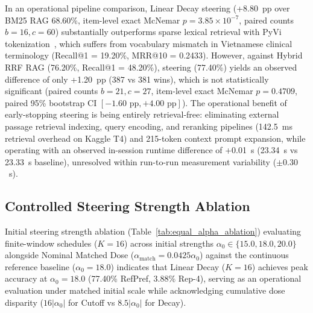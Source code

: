 \documentclass[runningheads]{llncs}
\begin{document}
In an operational pipeline comparison, Linear Decay steering (+8.80~pp over BM25 RAG 68.60\%, item-level exact McNemar $p = 3.85 \times 10^{-7}$, paired counts $b=16, c=60$) substantially outperforms sparse lexical retrieval with PyVi tokenization~\cite{ref_pyvi}, which suffers from vocabulary mismatch in Vietnamese clinical terminology (Recall@1 = 19.20\%, MRR@10 = 0.2433). However, against Hybrid RRF RAG (76.20\%, Recall@1 = 48.20\%), steering (77.40\%) yields an observed difference of only +1.20~pp (387 vs 381 wins), which is not statistically significant (paired counts $b=21, c=27$, item-level exact McNemar $p = 0.4709$, paired 95\% bootstrap CI $[-1.60\text{ pp}, +4.00\text{ pp}]$). The operational benefit of early-stopping steering is being entirely retrieval-free: eliminating external passage retrieval indexing, query encoding, and reranking pipelines (142.5~ms retrieval overhead on Kaggle T4) and 215-token context prompt expansion, while operating with an observed in-session runtime difference of +0.01~s (23.34~s vs 23.33~s baseline), unresolved within run-to-run measurement variability ($\pm 0.30$~s).

\subsection{Controlled Steering Strength Ablation}
Initial steering strength ablation (Table~\ref{tab:equal_alpha_ablation}) evaluating finite-window schedules ($K=16$) across initial strengths $\alpha_0 \in \{15.0, 18.0, 20.0\}$ alongside Nominal Matched Dose ($\alpha_{\text{match}} = 0.0425 \alpha_0$) against the continuous reference baseline ($\alpha_0=18.0$) indicates that Linear Decay ($K=16$) achieves peak accuracy at $\alpha_0 = 18.0$ (77.40\% RefPref, 3.88\% Rep-4), serving as an operational evaluation under matched initial scale while acknowledging cumulative dose disparity ($16|\alpha_0|$ for Cutoff vs $8.5|\alpha_0|$ for Decay).
\end{document}
